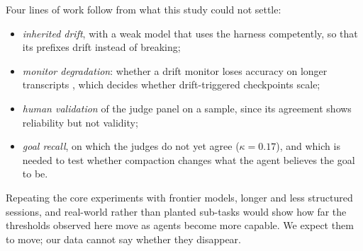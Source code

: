 Four lines of work follow from what this study could not settle:
\begin{itemize}
  \item \emph{inherited drift}, with a weak model that uses the harness competently, so that its
        prefixes drift instead of breaking;
  \item \emph{monitor degradation}: whether a drift monitor loses accuracy on longer transcripts
        \citep{martin2026classifier}, which decides whether drift-triggered checkpoints scale;
  \item \emph{human validation} of the judge panel on a sample, since its agreement shows
        reliability but not validity;
  \item \emph{goal recall}, on which the judges do not yet agree ($\kappa=0.17$), and which is needed
        to test whether compaction changes what the agent believes the goal to be.
\end{itemize}
Repeating the core experiments with frontier models, longer and less structured sessions, and
real-world rather than planted sub-tasks would show how far the thresholds observed here move as
agents become more capable. We expect them to move; our data cannot say whether they disappear.
